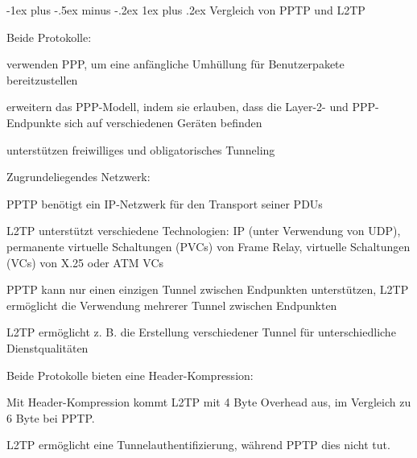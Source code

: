 \documentclass[a4paper]{article}
\makeatletter
\renewcommand{\subsubsection}{\@startsection{subsubsection}{3}{0mm}%
 {-1ex plus -.5ex minus -.2ex}%
 {1ex plus .2ex}%
 {\normalfont\small\bfseries}}
\makeatother
\begin{document}
\begin{multicols}{3}
      \subsubsection{Vergleich von PPTP und L2TP}
      \begin{itemize*}
            \item Beide Protokolle:
            \begin{itemize*}
                  \item verwenden PPP, um eine anfängliche Umhüllung für Benutzerpakete bereitzustellen
                  \item erweitern das PPP-Modell, indem sie erlauben, dass die Layer-2- und PPP-Endpunkte sich auf verschiedenen Geräten befinden
                  \item unterstützen freiwilliges und obligatorisches Tunneling
            \end{itemize*}
            \item Zugrundeliegendes Netzwerk:
            \begin{itemize*}
                  \item PPTP benötigt ein IP-Netzwerk für den Transport seiner PDUs
                  \item L2TP unterstützt verschiedene Technologien: IP (unter Verwendung von UDP), permanente virtuelle Schaltungen (PVCs) von Frame Relay, virtuelle Schaltungen (VCs) von X.25 oder ATM VCs
            \end{itemize*}
            \item PPTP kann nur einen einzigen Tunnel zwischen Endpunkten unterstützen, L2TP ermöglicht die Verwendung mehrerer Tunnel zwischen Endpunkten
            \begin{itemize*}
                  \item L2TP ermöglicht z. B. die Erstellung verschiedener Tunnel für unterschiedliche Dienstqualitäten
            \end{itemize*}
            \item Beide Protokolle bieten eine Header-Kompression:
            \begin{itemize*}
                  \item Mit Header-Kompression kommt L2TP mit 4 Byte Overhead aus, im Vergleich zu 6 Byte bei PPTP.
            \end{itemize*}
            \item L2TP ermöglicht eine Tunnelauthentifizierung, während PPTP dies nicht tut.
      \end{itemize*}


\end{multicols}
\end{document}
